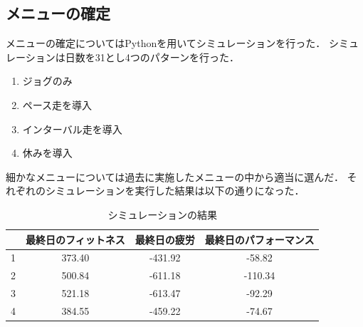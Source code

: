 \documentclass[12pt,fleqn]{jreport}
\begin{document}
\subsection{メニューの確定}
メニューの確定についてはPythonを用いてシミュレーションを行った．
シミュレーションは日数を31とし4つのパターンを行った．
\begin{enumerate}
  \item ジョグのみ
  \item ペース走を導入
  \item インターバル走を導入
  \item 休みを導入
\end{enumerate}
細かなメニューについては過去に実施したメニューの中から適当に選んだ．
それぞれのシミュレーションを実行した結果は以下の通りになった．
\begin{table}[H]
  \caption{シミュレーションの結果}
  \begin{center}
    \begin{tabular}{|c|c|c|c|}
      \hline
        & 最終日のフィットネス & 最終日の疲労 & 最終日のパフォーマンス \\
      \hline
      1 & 373.40               & -431.92      & -58.82                 \\
      \hline
      2 & 500.84               & -611.18      & -110.34                \\
      \hline
      3 & 521.18               & -613.47      & -92.29                 \\
      \hline
      4 & 384.55               & -459.22      & -74.67                 \\
      \hline
    \end{tabular}
  \end{center}
\end{table}
\end{document}
